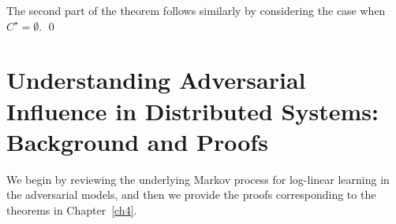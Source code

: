 The second part of the theorem follows similarly by considering the case when $C^\star = \emptyset.$ \hfill\qed










\section{Understanding Adversarial Influence in Distributed Systems: Background and Proofs}

We begin by reviewing the underlying Markov process for log-linear learning in the adversarial models, and then we provide the proofs corresponding to the theorems in Chapter~\ref{ch4}.

